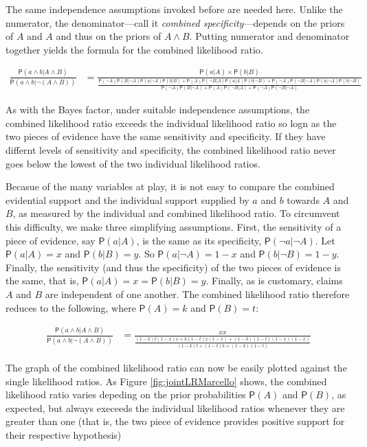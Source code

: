\documentclass[10pt,dvipsnames,enabledeprecatedfontcommands]{scrartcl}
\newcommand{\et}{\wedge}
\newcommand{\pr}[1]{\mathsf{P}(#1)}
\begin{document}
\noindent  The same independence assumptions invoked before are needed
here. Unlike the numerator, the denominator---call it
\textit{combined specificity}---depends on the priors of \(A\) and \(A\)
and thus on the priors of \(A\wedge B\). Putting numerator and
denominator together yields the formula for the combined likelihood
ratio.

\begin{align*}
\frac{\pr{a \wedge b \vert A\wedge B}}{\pr{a \et b| \neg (A\et B)}} & = \frac{\pr{a | A} \times \pr{b | B}}{\frac{\pr{\neg A}\pr{B \vert \neg A} \pr{a | \neg A}\pr{b | B} + \pr{A}\pr{\neg B \vert A} \pr{a | A }\pr{b | \neg B} + \pr{\neg A}\pr{\neg B \vert \neg A } \pr{a | \neg A}\pr{b | \neg B}}{\pr{\neg A}\pr{B \vert \neg A} + \pr{A}\pr{\neg B \vert A } + \pr{\neg A}\pr{\neg B \vert \neg A} } }
 \end{align*}

As with the Bayes factor, under suitable independence assumptions, the
combined likelihood ratio exceeds the individual likelihood ratio so
logn as the two pieces of evidence have the same sensitivity and
specificity. If they have differnt levels of sensitivity and
specificity, the combined likelihood ratio never goes below the lowest
of the two individual likelihood ratios.

Becasue of the many variables at play, it is not easy to compare the
combined evidential support and the individual support supplied by \(a\)
and \(b\) towards \(A\) and \(B\), as measured by the individual and
combined likelihood ratio. To circumvent this difficulty, we make three
simplifying assumptions. First, the sensitivity of a piece of evidence,
say \(\pr{a |A}\), is the same as its specificity,
\(\pr{\neg a | \neg A}\). Let \(\pr{a |A}=x\) and \(\pr{b |B}=y\). So
\(\pr{a |\neg A}=1-x\) and \(\pr{b | \neg B}=1-y\). Finally, the
sensitivity (and thus the specificity) of the two pieces of evidence is
the same, that is, \(\pr{a |A}=x=\pr{b |B}=y\). Finally, as is
customary, claims \(A\) and \(B\) are independent of one another. The
combined likelihood ratio therefore reduces to the following, where
\(\pr{A}=k\) and \(\pr{B}=t\):

\begin{align*}
\frac{\pr{a \wedge b \vert A\wedge B}}{\pr{a \et b| \neg (A\et B)}} & = \frac{xx}{\frac{(1-k)t(1-x)x + k(1-t)x(1-x) + (1-k)(1-t)(1-x)(1-x)}{ \left(1-k\right) t +\left(1-t\right) k+\left(1-k\right) \left(1-t\right)}}
 \end{align*}

\noindent The graph of the combined likelihood ratio can now be easily
plotted against the single likelihood ratios. As Figure
\ref{fig:jointLRMarcello} shows, the combined likelihood ratio varies
depeding on the prior probabilities \(\pr{A}\) and \(\pr{B}\), as
expected, but always execeeds the individual likelihood ratios whenever
they are greater than one (that is, the two piece of evidence provides
positive support for their respective hypothesis)
\end{document}
